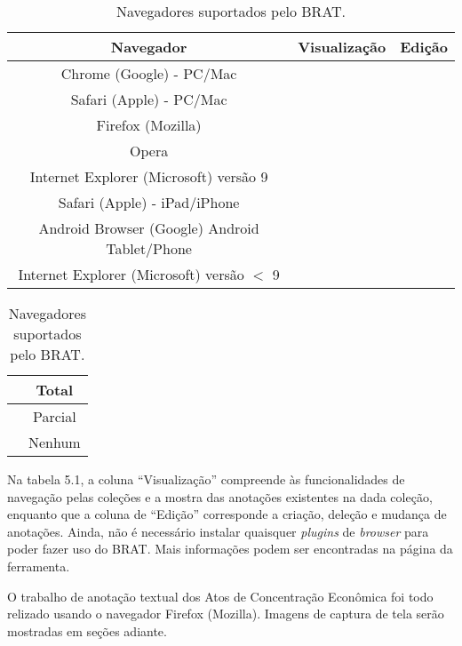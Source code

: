 \documentclass[11pt]{report}
\newcommand{\quotes}[1]{``#1''}
\begin{document}
\begin{table}[h!]
  \centering
  \def\arraystretch{0.97}
  \begin{tabular}{| c | c | c |}
    \hline
    Navegador & Visualização & Edição \\
    \hline\hline
    Chrome (Google) - PC/Mac                      & \cellcolor{strong} & \cellcolor{strong}   \\ \hline
    Safari (Apple) - PC/Mac                       & \cellcolor{strong} & \cellcolor{strong}   \\ \hline
    Firefox (Mozilla)                             & \cellcolor{strong} & \cellcolor{moderate} \\ \hline
    Opera                                         & \cellcolor{strong} & \cellcolor{moderate} \\ \hline
    Internet Explorer (Microsoft) versão 9        & \cellcolor{strong} & \cellcolor{moderate} \\ \hline
    Safari (Apple) - iPad/iPhone                  & \cellcolor{strong} & \cellcolor{moderate} \\ \hline
    Android Browser (Google) Android Tablet/Phone & \cellcolor{strong} & \cellcolor{weak}     \\ \hline
    Internet Explorer (Microsoft) versão $<$ 9    & \cellcolor{weak}   & \cellcolor{weak}     \\ \hline
  \end{tabular}
  \begin{tabular}{| c | c |}
    \hline
    \cellcolor{strong} & Total \\ \hline
    \cellcolor{moderate} & Parcial \\ \hline
    \cellcolor{weak} & Nenhum \\ \hline
  \end{tabular}
  \caption{Navegadores suportados pelo BRAT.}
\end{table}

Na tabela 5.1, a coluna \quotes{Visualização} compreende às funcionalidades de navegação pelas coleções e a mostra das anotações existentes na dada coleção, enquanto
que a coluna de \quotes{Edição} corresponde a criação, deleção e mudança de anotações. Ainda, não é necessário instalar quaisquer \textit{plugins} de \textit{browser}
para poder fazer uso do BRAT. Mais informações podem ser encontradas na página da ferramenta.

O trabalho de anotação textual dos Atos de Concentração Econômica foi todo relizado usando o navegador Firefox (Mozilla).
Imagens de captura de tela serão mostradas em seções adiante.
\end{document}
